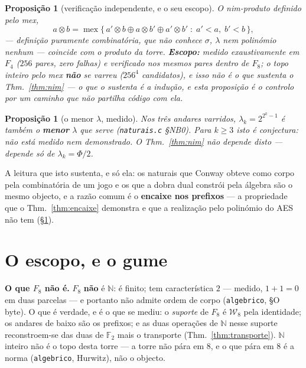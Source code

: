 \documentclass[11pt,a4paper]{article}
\newtheorem{proposicao}[teorema]{Proposição}
\newcommand{\code}[1]{\texttt{\small #1}}
\newcommand{\Word}{\mathcal{W}}
\newcommand{\FF}{\mathbb{F}}
\begin{document}
\begin{proposicao}[verificação independente, e o seu escopo]\label{prop:mex}
O nim-produto definido pelo \emph{mex},
\[
a\otimes b=\operatorname{mex}\{\,a'\otimes b\oplus a\otimes b'\oplus a'\otimes b'
\;:\;a'<a,\;b'<b\,\},
\]
--- definição puramente combinatória, que não conhece $\sigma$, $\lambda$ nem
polinómio nenhum --- coincide com o produto da torre. \textbf{Escopo:} medido
exaustivamente em $F_4$ ($256$ pares, zero falhas) e verificado nos mesmos
pares dentro de $F_8$; o topo inteiro pelo mex \textbf{não} se varreu
($256^{4}$ candidatos), e isso não é o que sustenta o Thm.~\ref{thm:nim} --- o
que o sustenta é a indução, e esta proposição é o controlo por um caminho que
não partilha código com ela.
\end{proposicao}

\begin{proposicao}[o menor $\lambda$, medido]\label{prop:menor}
Nos três andares varridos, $\lambda_k=2^{2^{k}-1}$ é também o \textbf{menor}
$\lambda$ que serve (\code{naturais.c} §NB0). Para $k\ge3$ isto é
\emph{conjectura}: não está medido nem demonstrado. O Thm.~\ref{thm:nim} não
depende disto --- depende só de $\lambda_k=\Phi/2$.
\end{proposicao}

\medskip\noindent A leitura que isto sustenta, e só ela: os naturais que Conway
obteve como corpo pela combinatória de um jogo e os que a dobra dual constrói
pela álgebra são o mesmo objecto, e a razão comum é o \textbf{encaixe nos
prefixos} --- a propriedade que o Thm.~\ref{thm:encaixe} demonstra e que a
realização pelo polinómio do AES não tem (§\ref{sec:escopo}).

\section{O escopo, e o gume}\label{sec:escopo}

\noindent\textbf{O que $F_8$ não é.} $F_8$ \textbf{não} é $\mathbb{N}$:
é finito; tem característica $2$ --- medido, $1+1=0$ em duas parcelas --- e
portanto não admite ordem de corpo (\code{algebrico}, §O byte). O que é
verdade, e é o que se mediu: o \emph{suporte} de $F_8$ é $\Word_8$ pela
identidade; os andares de baixo são os prefixos; e as duas operações de
$\mathbb{N}$ nesse suporte reconstroem-se das duas de $\FF_2$ mais o
transporte (Thm.~\ref{thm:transporte}). $\mathbb{N}$ inteiro não é o topo desta
torre --- a torre não pára em $8$, e o que pára em $8$ é a norma
(\code{algebrico}, Hurwitz), não o objecto.
\end{document}
